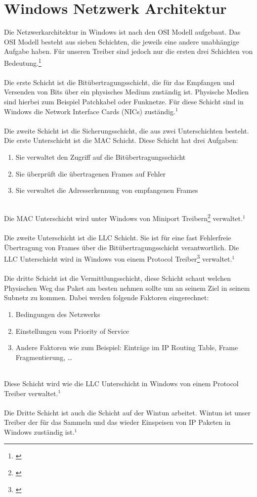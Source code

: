 \newpage

\section{Windows Netzwerk Architektur}

Die Netzwerkarchitektur in Windows ist nach den OSI Modell aufgebaut. Das OSI Modell besteht aus sieben Schichten, die jeweils eine andere unabhängige Aufgabe haben. Für unseren Treiber sind jedoch nur die ersten drei Schichten von Bedeutung.\footnote[1]{\cite[Vgl.][]{27}}
\\\\
Die erste Schicht ist die Bitübertragungsschicht, die für das Empfangen und Versenden von Bits über ein physisches Medium zuständig ist. Physische Medien sind hierbei zum Beispiel Patchkabel oder Funknetze. Für diese Schicht sind in Windows die Network Interface Cards (NICs) zuständig.$^{1}$
\\\\
Die zweite Schicht ist die Sicherungsschicht, die aus zwei Unterschichten besteht. Die erste Unterschicht ist die MAC Schicht. Diese Schicht hat drei Aufgaben:
\\
\begin{enumerate}
    \item Sie verwaltet den Zugriff auf die Bitübertragungsschicht
    \item Sie überprüft die übertragenen Frames auf Fehler
    \item Sie verwaltet die Adresserkennung von empfangenen Frames
\end{enumerate}
\ \\
Die MAC Unterschicht wird unter Windows von Miniport Treibern\footnote[3]{\cite[Vgl.][]{25}} verwaltet.$^{1}$
\\\\
Die zweite Unterschicht ist die LLC Schicht. Sie ist für eine fast Fehlerfreie Übertragung von Frames über die Bitübertragungsschicht verantwortlich. Die LLC Unterschicht wird in Windows von einem Protocol Treiber\footnote[5]{\cite[Vgl.][]{26}} verwaltet.$^{1}$
\\\\
Die dritte Schicht ist die Vermittlungsschicht, diese Schicht schaut welchen Physischen Weg das Paket am besten nehmen sollte um an seinem Ziel in seinem Subnetz zu kommen. Dabei werden folgende Faktoren eingerechnet:
\\
\begin{enumerate}
    \item Bedingungen des Netzwerks
    \item Einstellungen vom Priority of Service
    \item Andere Faktoren wie zum Beispiel: Einträge im IP Routing Table, Frame Fragmentierung, …
\end{enumerate}
\ \\
Diese Schicht wird wie die LLC Unterschicht in Windows von einem Protocol Treiber verwaltet.$^{1}$
\\\\
Die Dritte Schicht ist auch die Schicht auf der Wintun arbeitet. Wintun ist unser Treiber der für das Sammeln und das wieder Einspeisen von IP Paketen in Windows zuständig ist.$^{1}$

